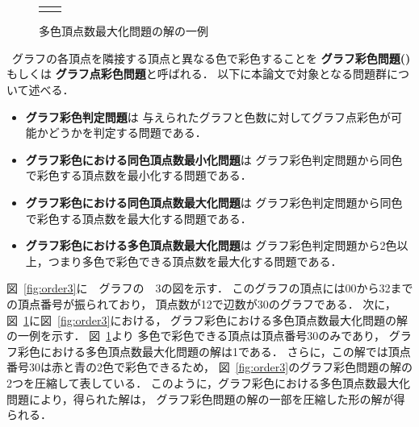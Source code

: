 \begin{figure}[tb]
\begin{tabular}{cc}
\begin{minipage}[t]{0.45\linewidth}
      \caption{多色頂点数最大化問題の解の一例}
      \label{fig:order3mult}
    \end{minipage}
  \end{tabular}
\end{figure}

\, グラフの各頂点を隣接する頂点と異なる色で彩色することを
\textbf{グラフ彩色問題()}もしくは
\textbf{グラフ点彩色問題}と呼ばれる．
以下に本論文で対象となる問題群について述べる．

\begin{itemize}
\item \textbf{グラフ彩色判定問題}は
  与えられたグラフと色数に対してグラフ点彩色が可能かどうかを判定する問題である．
\item \textbf{グラフ彩色における同色頂点数最小化問題}は
  グラフ彩色判定問題から同色で彩色する頂点数を最小化する問題である．
\item \textbf{グラフ彩色における同色頂点数最大化問題}は
  グラフ彩色判定問題から同色で彩色する頂点数を最大化する問題である．
\item \textbf{グラフ彩色における多色頂点数最大化問題}は
  グラフ彩色判定問題から2色以上，つまり多色で彩色できる頂点数を最大化する問題である．
\end{itemize}

図~\ref{fig:order3}に~~グラフの~~3の図を示す．
このグラフの頂点には00から32までの頂点番号が振られており，
頂点数が12で辺数が30のグラフである．
次に，図~\ref{fig:order3mult}に図~\ref{fig:order3}における，
グラフ彩色における多色頂点数最大化問題の解の一例を示す．
図~\ref{fig:order3mult}より
多色で彩色できる頂点は頂点番号30のみであり，
グラフ彩色における多色頂点数最大化問題の解は1である．
さらに，この解では頂点番号30は赤と青の2色で彩色できるため，
図~\ref{fig:order3}のグラフ彩色問題の解の2つを圧縮して表している．
このように，グラフ彩色における多色頂点数最大化問題により，得られた解は，
グラフ彩色問題の解の一部を圧縮した形の解が得られる．


